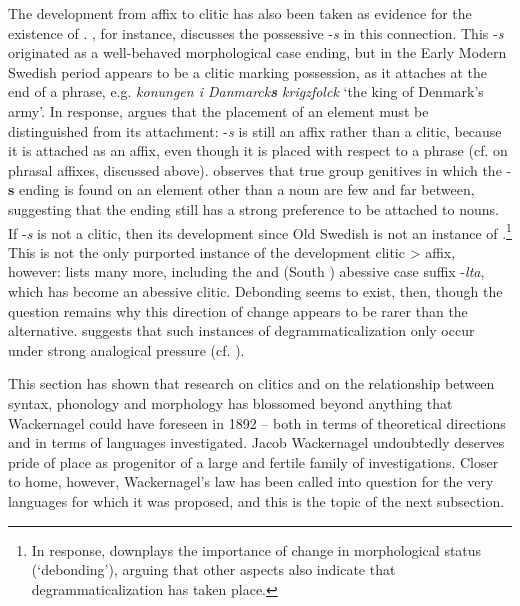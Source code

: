 The development from affix to clitic has also been taken as evidence for the existence of . \citet{Norde2001}, for instance, discusses the  possessive -\textit{s} in this connection. This -\textit{s} originated as a well-behaved morphological  case ending, but in the Early Modern Swedish period appears to be a clitic marking possession, as it attaches at the end of a phrase, e.g. \textit{konungen i Danmarck\textbf{s} krigzfolck} `the king of Denmark's army'. In response, \citet{Boerjars2003} argues that the placement of an element must be distinguished from its attachment:  -\textit{s} is still an affix rather than a clitic, because it is attached as an affix, even though it is placed with respect to a phrase (cf. \citet{Anderson1993} on phrasal affixes, discussed above). \citeauthor{Boerjars2003} observes that true group genitives in which the -\textbf{s} ending is found on an element other than a noun are few and far between, suggesting that the ending still has a strong preference to be attached to nouns. If -\textit{s} is not a clitic, then its development since Old Swedish is not an instance of .\footnote{In response, \citet{Norde2010} downplays the importance of change in morphological status (`debonding'), arguing that other aspects also indicate that degrammaticalization has taken place.} This is not the only purported instance of the development clitic > affix, however: \citet{Kiparsky2012} lists many more, including the  and  (South ) abessive case suffix -\textit{lta}, which has become an abessive clitic. Debonding seems to exist, then, though the question remains why this direction of change appears to be rarer than the alternative. \citet{Kiparsky2012} suggests that such instances of degrammaticalization only occur under strong analogical pressure (cf. \citealp{Plank1995}).

This section has shown that research on clitics and on the relationship between syntax, phonology and morphology has blossomed beyond anything that Wackernagel could have foreseen in 1892 -- both in terms of theoretical directions and in terms of languages investigated. Jacob Wackernagel undoubtedly deserves pride of place as progenitor of a large and fertile family of investigations. Closer to home, however, Wackernagel's law has been called into question for the very languages for which it was proposed, and this is the topic of the next subsection.

